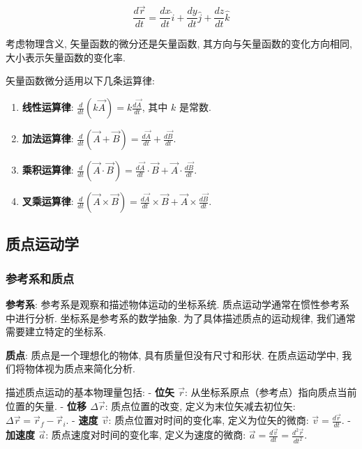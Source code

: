 \documentclass[
  a4paper,
]{ctexrep}
\begin{document}
\[\frac{d\vec{r}}{dt} = \frac{dx}{dt}\hat{i} + \frac{dy}{dt}\hat{j} + \frac{dz}{dt}\hat{k}\]

考虑物理含义, 矢量函数的微分还是矢量函数,
其方向与矢量函数的变化方向相同, 大小表示矢量函数的变化率.

矢量函数微分适用以下几条运算律:

\begin{enumerate}
\def\labelenumi{\arabic{enumi}.}
\item
  \textbf{线性运算律}:
  \(\frac{d}{dt}(k\vec{A}) = k\frac{d\vec{A}}{dt}\), 其中 \(k\) 是常数.
\item
  \textbf{加法运算律}:
  \(\frac{d}{dt}(\vec{A} + \vec{B}) = \frac{d\vec{A}}{dt} + \frac{d\vec{B}}{dt}\).
\item
  \textbf{乘积运算律}:
  \(\frac{d}{dt}(\vec{A} \cdot \vec{B}) = \frac{d\vec{A}}{dt} \cdot \vec{B} + \vec{A} \cdot \frac{d\vec{B}}{dt}\).
\item
  \textbf{叉乘运算律}:
  \(\frac{d}{dt}(\vec{A} \times \vec{B}) = \frac{d\vec{A}}{dt} \times \vec{B} + \vec{A} \times \frac{d\vec{B}}{dt}\).
\end{enumerate}

\subsection{质点运动学}\label{ux8d28ux70b9ux8fd0ux52a8ux5b66}

\subsubsection{参考系和质点}\label{ux53c2ux8003ux7cfbux548cux8d28ux70b9}

\textbf{参考系}: 参考系是观察和描述物体运动的坐标系统.
质点运动学通常在惯性参考系中进行分析. 坐标系是参考系的数学抽象.
为了具体描述质点的运动规律, 我们通常需要建立特定的坐标系.

\textbf{质点}: 质点是一个理想化的物体, 具有质量但没有尺寸和形状.
在质点运动学中, 我们将物体视为质点来简化分析.

描述质点运动的基本物理量包括: - \textbf{位矢 \(\vec{r}\)}:
从坐标系原点（参考点）指向质点当前位置的矢量. - \textbf{位移
\(\Delta \vec{r}\)}: 质点位置的改变, 定义为末位矢减去初位矢:
\(\Delta \vec{r} = \vec{r}_f - \vec{r}_i\). - \textbf{速度 \(\vec{v}\)}:
质点位置对时间的变化率, 定义为位矢的微商:
\(\vec{v} = \frac{d\vec{r}}{dt}\). - \textbf{加速度 \(\vec{a}\)}:
质点速度对时间的变化率, 定义为速度的微商:
\(\vec{a} = \frac{d\vec{v}}{dt} = \frac{d^2\vec{r}}{dt^2}\).
\end{document}
